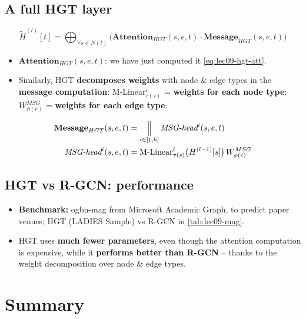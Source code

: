 \subsection{A full HGT layer}\label{sec:lec09-hgtlayer}

\begin{equation}\label{eq:lec09-hgt-layer}
  \widetilde{H}^{(l)}[t] = \bigoplus_{\forall s\in N(t)}
    \Big(\mathbf{Attention}_{HGT}(s,e,t)\cdot\mathbf{Message}_{HGT}(s,e,t)\Big)
\end{equation}
\begin{itemize}
  \item $\mathbf{Attention}_{HGT}(s,e,t)$: we have just computed it
    \eqref{eq:lec09-hgt-att}.
  \item Similarly, HGT \textbf{decomposes weights} with node \& edge types in the
    \textbf{message computation}: M-Linear$_{\tau(s)}^{i}$ = \textbf{weights for
    each node type}; $W^{MSG}_{\phi(e)}$ = \textbf{weights for each edge type}:
\end{itemize}
\begin{align}
  \mathbf{Message}_{HGT}(s,e,t) &= \mathop{\Big\|}_{i\in[1,h]}\textit{MSG-head}^{i}(s,e,t)
    \label{eq:lec09-hgt-msg}\\
  \textit{MSG-head}^{i}(s,e,t) &= \text{M-Linear}^{i}_{\tau(s)}\big(H^{(l-1)}[s]\big)\,W^{MSG}_{\phi(e)}
    \notag
\end{align}

\subsection{HGT vs R-GCN: performance}\label{sec:lec09-hgtperf}

\begin{itemize}
  \item \textbf{Benchmark:} ogbn-mag from Microsoft Academic Graph, to predict
    paper venues; HGT (LADIES Sample) vs R-GCN in \cref{tab:lec09-mag}.
  \item HGT uses \textbf{much fewer parameters}, even though the attention
    computation is expensive, while it \textbf{performs better than R-GCN} --
    thanks to the weight decomposition over node \& edge types.
\end{itemize}

\section{Summary}\label{sec:lec09-summary}

